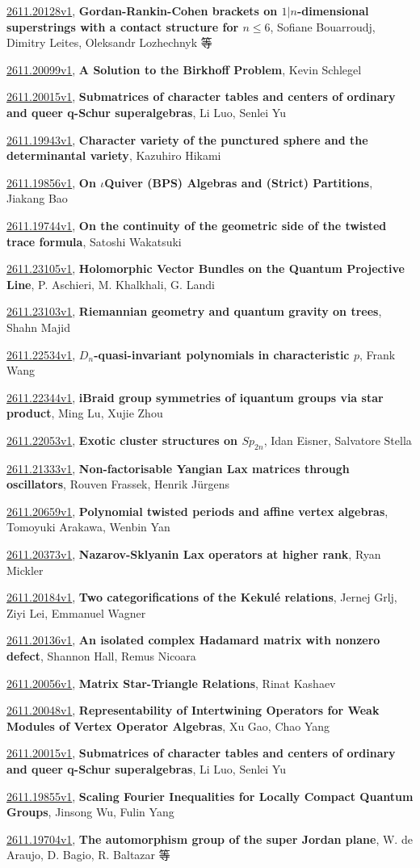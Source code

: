 \documentclass[9pt, a4paper]{article}
\theoremstyle{plain}
\theoremstyle{definition}
\theoremstyle{remark}
\newcommand{\arxiv}[3]{\href{https://arxiv.org/abs/#1}{#1}, \textbf{\textcolor{arxivblue}{#2}}, #3}
\begin{document}
\arxiv{2611.20128v1}{Gordan-Rankin-Cohen brackets on $1|n$-dimensional superstrings with a contact structure for $n\leq 6$}{Sofiane Bouarroudj, Dimitry Leites, Oleksandr Lozhechnyk 等}

\arxiv{2611.20099v1}{A Solution to the Birkhoff Problem}{Kevin Schlegel}

\arxiv{2611.20015v1}{Submatrices of character tables and centers of ordinary and queer q-Schur superalgebras}{Li Luo, Senlei Yu}

\arxiv{2611.19943v1}{Character variety of the punctured sphere and the determinantal variety}{Kazuhiro Hikami}

\arxiv{2611.19856v1}{On $ι$Quiver (BPS) Algebras and (Strict) Partitions}{Jiakang Bao}

\arxiv{2611.19744v1}{On the continuity of the geometric side of the twisted trace formula}{Satoshi Wakatsuki}

\arxiv{2611.23105v1}{Holomorphic Vector Bundles on the Quantum Projective Line}{P. Aschieri, M. Khalkhali, G. Landi}

\arxiv{2611.23103v1}{Riemannian geometry and quantum gravity on trees}{Shahn Majid}

\arxiv{2611.22534v1}{$D_n$-quasi-invariant polynomials in characteristic $p$}{Frank Wang}

\arxiv{2611.22344v1}{iBraid group symmetries of iquantum groups via star product}{Ming Lu, Xujie Zhou}

\arxiv{2611.22053v1}{Exotic cluster structures on $Sp_{2n}$}{Idan Eisner, Salvatore Stella}

\arxiv{2611.21333v1}{Non-factorisable Yangian Lax matrices through oscillators}{Rouven Frassek, Henrik Jürgens}

\arxiv{2611.20659v1}{Polynomial twisted periods and affine vertex algebras}{Tomoyuki Arakawa, Wenbin Yan}

\arxiv{2611.20373v1}{Nazarov-Sklyanin Lax operators at higher rank}{Ryan Mickler}

\arxiv{2611.20184v1}{Two categorifications of the Kekulé relations}{Jernej Grlj, Ziyi Lei, Emmanuel Wagner}

\arxiv{2611.20136v1}{An isolated complex Hadamard matrix with nonzero defect}{Shannon Hall, Remus Nicoara}

\arxiv{2611.20056v1}{Matrix Star-Triangle Relations}{Rinat Kashaev}

\arxiv{2611.20048v1}{Representability of Intertwining Operators for Weak Modules of Vertex Operator Algebras}{Xu Gao, Chao Yang}

\arxiv{2611.20015v1}{Submatrices of character tables and centers of ordinary and queer q-Schur superalgebras}{Li Luo, Senlei Yu}

\arxiv{2611.19855v1}{Scaling Fourier Inequalities for Locally Compact Quantum Groups}{Jinsong Wu, Fulin Yang}

\arxiv{2611.19704v1}{The automorphism group of the super Jordan plane}{W. de Araujo, D. Bagio, R. Baltazar 等}

\end{document}
